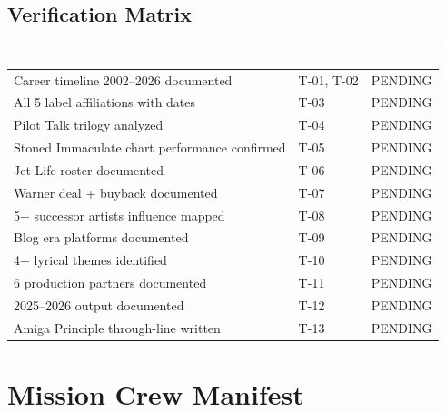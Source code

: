\documentclass[11pt,letterpaper]{article}
\newcommand{\tableheader}[1]{\textbf{\sffamily\textcolor{white}{#1}}}
\begin{document}
\subsection{Verification Matrix}

\begin{center}
\begin{tabularx}{\textwidth}{L{6cm}L{2cm}C{2cm}}
\toprule
{}
\tableheader{Success Criterion} & \tableheader{Test IDs} & \tableheader{Status} \\
\midrule
Career timeline 2002–2026 documented & T-01, T-02 & PENDING \\
All 5 label affiliations with dates & T-03 & PENDING \\
Pilot Talk trilogy analyzed & T-04 & PENDING \\
Stoned Immaculate chart performance confirmed & T-05 & PENDING \\
Jet Life roster documented & T-06 & PENDING \\
Warner deal + buyback documented & T-07 & PENDING \\
5+ successor artists influence mapped & T-08 & PENDING \\
Blog era platforms documented & T-09 & PENDING \\
4+ lyrical themes identified & T-10 & PENDING \\
6 production partners documented & T-11 & PENDING \\
2025–2026 output documented & T-12 & PENDING \\
Amiga Principle through-line written & T-13 & PENDING \\
\bottomrule
\end{tabularx}
\end{center}

\section{Mission Crew Manifest}
\end{document}

